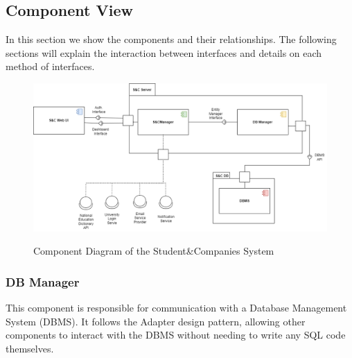 \documentclass[a4paper,12pt]{article}
\begin{document}
\subsection{Component View}
In this section we show the components and their relationships. The following
sections will explain the interaction between interfaces and details on each method of interfaces.
\begin{figure}[H]
\centering
\includegraphics[scale = 0.50]{DD_figures/GeneralComponentDiagram.drawio.png}\\
\caption{Component Diagram of the Student\&Companies System}
\end{figure}

\subsubsection{DB Manager}
This component is responsible for communication with a Database Management System (DBMS).
It follows the Adapter design pattern, allowing other components to interact with the DBMS
without needing to write any SQL code themselves.
\end{document}
